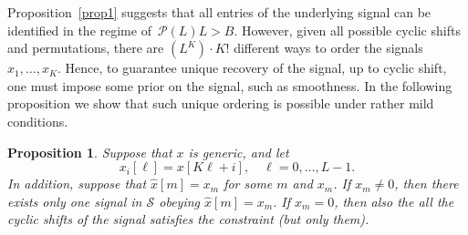 \documentclass[english,12pt]{article}
\newcommand{\hx}{\hat{x}}
\newcommand{\TODO}[1]{{\color{red}{[#1]}}}
\numberwithin{equation}{section}
\numberwithin{thm}{section} %
\newtheorem{prop}[thm]{Proposition}
\begin{document}
Proposition~\ref{prop1} suggests that all entries of the underlying signal can be identified in the regime of~$\mathcal{P}(L)L>B$. However, given all possible cyclic shifts and permutations, there are $(L^K)\cdot K!$ \TODO{check this number}  different ways to order the signals $x_1,\ldots,x_K$. Hence, to guarantee unique recovery of the signal, up to cyclic shift, one must impose some prior on the signal, such as smoothness. In the following proposition we show that such unique ordering is possible under rather mild conditions.
\begin{prop} \label{prop:bandlimit}
Suppose that $x$ is generic, and let 
\begin{equation} %
x_i[\ell] = x[K\ell + i], \quad \ell=0,\ldots,L-1.
\end{equation}
In addition, suppose that $\hx[m]=x_m$ for some $m$ and $x_m$.
If $x_m\neq 0$, then there exists only one signal in $\mathcal{S}$ obeying $\hx[m]=x_m$. If $x_m=0$, then also the all the cyclic shifts of the signal satisfies the constraint (but only them). 
\end{prop}	
\end{document}
